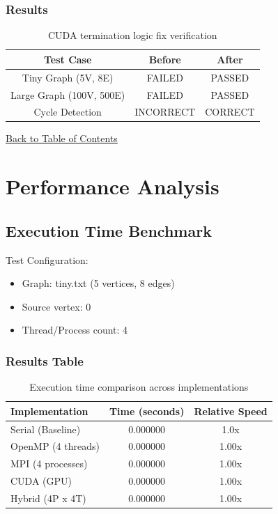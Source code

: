 \documentclass[12pt,a4paper]{article}
\begin{document}
\subsubsection*{Results}

\begin{table}[H]
    \centering
    \begin{tabular}{|c|c|c|}
    \hline
    \textbf{Test Case} & \textbf{Before} & \textbf{After} \\
    \hline
    Tiny Graph (5V, 8E) & FAILED & PASSED \\
    Large Graph (100V, 500E) & FAILED & PASSED \\
    Cycle Detection & INCORRECT & CORRECT \\
    \hline
    \end{tabular}
    \caption{CUDA termination logic fix verification}
    \label{tab:bug4_results}
\end{table}

\hyperref[contents]{\small Back to Table of Contents}

\newpage

\section{Performance Analysis}

\subsection{Execution Time Benchmark}

Test Configuration:
\begin{itemize}
    \item Graph: tiny.txt (5 vertices, 8 edges)
    \item Source vertex: 0
    \item Thread/Process count: 4
\end{itemize}

\subsubsection{Results Table}

\begin{table}[H]
    \centering
    \renewcommand{\arraystretch}{1.8}
    \begin{tabular}{|l|c|c|}
    \hline
    \textbf{Implementation} & \textbf{Time (seconds)} & \textbf{Relative Speed} \\
    \hline
    Serial (Baseline) & 0.000000 & 1.0x \\
    OpenMP (4 threads) & 0.000000 & 1.00x \\
    MPI (4 processes) & 0.000000 & 1.00x \\
    CUDA (GPU) & 0.000000 & 1.00x \\
    Hybrid (4P x 4T) & 0.000000 & 1.00x \\
    \hline
    \end{tabular}
    \caption{Execution time comparison across implementations}
    \label{tab:exec_times}
\end{table}
\end{document}
